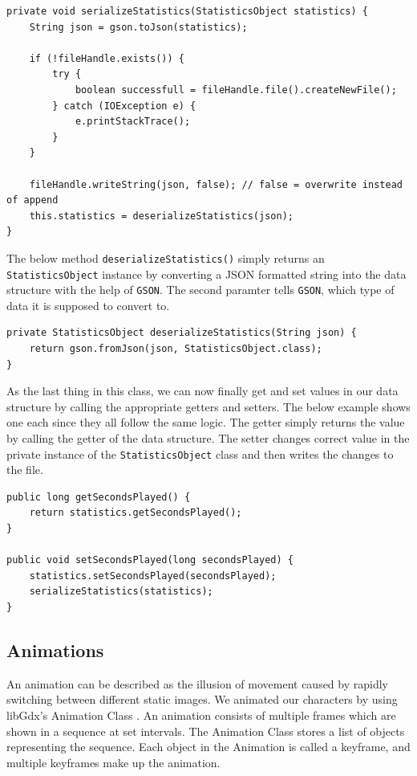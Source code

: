 \documentclass[12p]{article}
\begin{document}
\begin{verbatim}
private void serializeStatistics(StatisticsObject statistics) {
    String json = gson.toJson(statistics);

    if (!fileHandle.exists()) {
        try {
            boolean successfull = fileHandle.file().createNewFile();
        } catch (IOException e) {
            e.printStackTrace();
        }
    }

    fileHandle.writeString(json, false); // false = overwrite instead of append
    this.statistics = deserializeStatistics(json);
}
\end{verbatim}

The below method \texttt{deserializeStatistics()} simply returns an \texttt{StatisticsObject} instance by converting a JSON formatted string into the data structure with the help of \texttt{GSON}. The second paramter tells \texttt{GSON}, which type of data it is supposed to convert to.

\begin{verbatim}
private StatisticsObject deserializeStatistics(String json) {
    return gson.fromJson(json, StatisticsObject.class);
}
\end{verbatim}

As the last thing in this class, we can now finally get and set values in our data structure by calling the appropriate getters and setters. The below example shows one each since they all follow the same logic. The getter simply returns the value by calling the getter of the data structure. The setter changes correct value in the private instance of the \texttt{StatisticsObject} class and then writes the changes to the file.

\begin{verbatim}
public long getSecondsPlayed() {
    return statistics.getSecondsPlayed();
}

public void setSecondsPlayed(long secondsPlayed) {
    statistics.setSecondsPlayed(secondsPlayed);
    serializeStatistics(statistics);
}
\end{verbatim}


\subsection{Animations} \label{DocAnimations}

An animation can be described as the illusion of movement caused by rapidly switching between different static images. We animated our characters by using libGdx's Animation Class \cite{libGdxAnimClass}. An animation consists of multiple frames which are shown in a sequence at set intervals. The Animation Class stores a list of objects representing the sequence. Each object in the Animation is called a keyframe, and multiple keyframes make up the animation.
\end{document}
